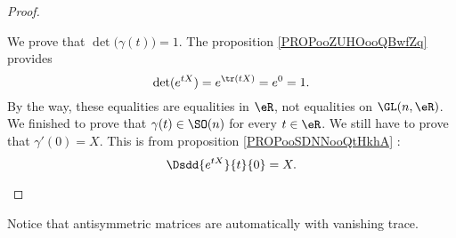 \begin{proof}
\begin{subproof}
\begin{subproof}
\begin{equation}
			\end{equation}
			 We prove that \( \det\big( \gamma(t) \big)=1\). The proposition \ref{PROPooZUHOooQBwfZq} provides
			\begin{equation}
				\det( e^{tX})= e^{\tr(tX)}= e^{0}=1.
			\end{equation}
			By the way, these equalities are equalities in \( \eR\), not equalities on \( \GL(n,\eR)\).
			\spitem[Pause]
			We finished to prove that \( \gamma(t)\in \SO(n)\) for every \( t\in \eR\). We still have to prove that \( \gamma'(0)=X\).
			\spitem[\( \gamma'(0)=X\)]
			This is from proposition \ref{PROPooSDNNooQtHkhA} :
			\begin{equation}
				\Dsdd{  e^{tX} }{t}{0}=X.
			\end{equation}
		\end{subproof}
	\end{subproof}
\end{proof}

\begin{normaltext}
	Notice that antisymmetric matrices are automatically with vanishing trace.
\end{normaltext}

